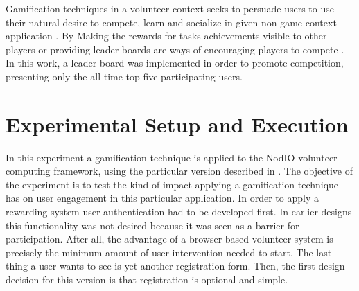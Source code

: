 \documentclass{llncs}
\begin{document}
Gamification techniques in a volunteer context seeks to persuade
users to use their natural desire to compete, learn and socialize in
given non-game context application \cite{deterding2011game,hamari2014does}.
By Making the rewards for  tasks achievements visible to other players or
providing leader boards are ways of encouraging players to compete
\cite{hickman2010total}. In this work, a leader board was implemented
in order to promote competition, presenting only the all-time top five
participating users.




\section{Experimental Setup and Execution} %
\label{sec:experiments}

In this experiment a gamification technique is applied to
the {\sf NodIO}
volunteer computing framework, using the
particular version described in \cite{DBLP:conf/gecco/MereloCGCRV16,2016arXiv160101607M}.
The objective of the experiment is to test the kind of impact
applying a gamification technique has on user engagement in this
particular application. In order to apply a rewarding system
user authentication had to be developed first. In earlier designs
this functionality was not desired because it was seen as a barrier
for participation. After all, the advantage of a browser based volunteer system
is precisely the minimum amount of user intervention needed to start.
The last thing a user wants to see is yet another registration form.
Then, the first design decision for this version is that registration
is optional and simple.
\end{document}
